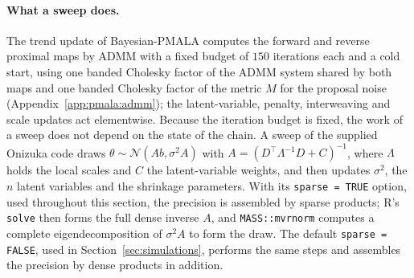 \paragraph{What a sweep does.} The trend update of Bayesian-PMALA computes the forward and reverse proximal maps by ADMM with a fixed budget of $150$ iterations each and a cold start, using one banded Cholesky factor of the ADMM system shared by both maps and one banded Cholesky factor of the metric $M$ for the proposal noise (Appendix~\ref{app:pmala:admm}); the latent-variable, penalty, interweaving and scale updates act elementwise. Because the iteration budget is fixed, the work of a sweep does not depend on the state of the chain. A sweep of the supplied Onizuka code draws $\theta \sim \mathcal N(A b, \sigma^2 A)$ with $A = (D^\top \Lambda^{-1} D + C)^{-1}$, where $\Lambda$ holds the local scales and $C$ the latent-variable weights, and then updates $\sigma^2$, the $n$ latent variables and the shrinkage parameters. With its \texttt{sparse = TRUE} option, used throughout this section, the precision is assembled by sparse products; R's \texttt{solve} then forms the full dense inverse $A$, and \texttt{MASS::mvrnorm} computes a complete eigendecomposition of $\sigma^2 A$ to form the draw. The default \texttt{sparse = FALSE}, used in Section~\ref{sec:simulations}, performs the same steps and assembles the precision by dense products in addition.

